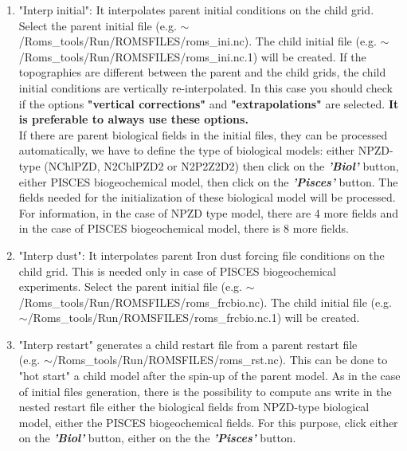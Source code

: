 \begin{enumerate}
\item "Interp initial": It interpolates parent initial conditions on the child grid.
  Select the parent initial file (e.g.
  $\sim$/Roms\_tools/Run/ROMSFILES/roms\_ini.nc).  The child initial file (e.g.
  $\sim$/Roms\_tools/Run/ROMSFILES/roms\_ini.nc.1) will be created.  If the
  topographies are different between the parent and the child grids, the child
  initial conditions are vertically re-interpolated. In this case you should check if
  the options \textbf{"vertical corrections"} and \textbf{"extrapolations"}
  are selected. \textbf{It is preferable to always use these options.} \\
  If there are parent biological fields in the initial files, they can be processed
  automatically, we have to define the type of biological models: either NPZD-type
  (NChlPZD, N2ChlPZD2 or N2P2Z2D2) then click on the \textit{\textbf{'Biol'}}
  button, either PISCES biogeochemical model, then click on the
  \textit{\textbf{'Pisces'}} button. The fields needed for the initialization of
  these biological model will be processed. \\
  For information, in the case of NPZD type model, there are 4 more fields and in the
  case of PISCES biogeochemical model, there is 8 more fields.


\item "Interp dust": It interpolates parent Iron dust forcing file conditions on the
  child grid.  This is needed only in case of PISCES biogeochemical experiments.
  Select the parent initial file (e.g.
  $\sim$/Roms\_tools/Run/ROMSFILES/roms\_frcbio.nc).  The child initial file (e.g.
  $\sim$/Roms\_tools/Run/ROMSFILES/roms\_frcbio.nc.1) will be created.

\item "Interp restart" generates a child restart file from
  a parent restart file \\
  (e.g. $\sim$/Roms\_tools/Run/ROMSFILES/roms\_rst.nc).  This can be done to "hot
  start" a child model after the spin-up of the parent model. As in the case of
  initial files generation, there is the possibility to compute ans write in the
  nested restart file either the biological fields from NPZD-type biological model,
  either the PISCES biogeochemical fields.  For this purpose, click either on the
  \textit{\textbf{'Biol'}} button, either on the the \textit{\textbf{'Pisces'}}
  button.


\end{enumerate}
